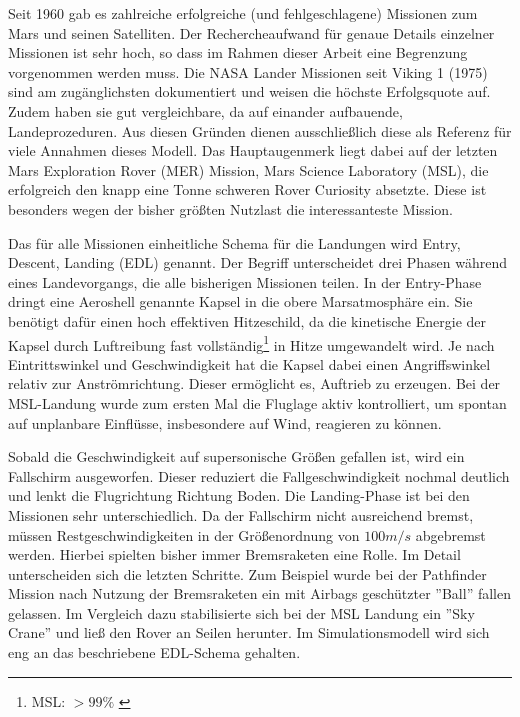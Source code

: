 Seit 1960 gab es zahlreiche erfolgreiche (und fehlgeschlagene) Missionen zum Mars und seinen Satelliten. Der Rechercheaufwand für genaue Details einzelner Missionen ist sehr hoch, so dass im Rahmen dieser Arbeit eine Begrenzung vorgenommen werden muss. Die NASA Lander Missionen seit Viking 1 (1975) sind am zugänglichsten dokumentiert und weisen die höchste Erfolgsquote auf. Zudem haben sie gut vergleichbare, da auf einander aufbauende, Landeprozeduren. Aus diesen Gründen dienen ausschließlich diese als Referenz für viele Annahmen dieses Modell. Das Hauptaugenmerk liegt dabei auf der letzten Mars Exploration Rover (MER) Mission, Mars Science Laboratory (MSL), die erfolgreich den knapp eine Tonne \cite{Way2007} schweren Rover Curiosity absetzte. Diese ist besonders wegen der bisher größten Nutzlast die interessanteste Mission.

Das für alle Missionen einheitliche Schema für die Landungen wird Entry, Descent, Landing (EDL) genannt. Der Begriff unterscheidet drei Phasen während eines Landevorgangs, die alle bisherigen Missionen teilen. In der Entry-Phase dringt eine Aeroshell genannte Kapsel in die obere Marsatmosphäre ein. Sie benötigt dafür einen hoch effektiven Hitzeschild, da die kinetische Energie der Kapsel durch Luftreibung fast vollständig\footnote{MSL: $>99\%$ \cite{Edquist2009}} in Hitze umgewandelt wird. Je nach Eintrittswinkel und Geschwindigkeit hat die Kapsel dabei einen Angriffswinkel relativ zur Anströmrichtung. Dieser ermöglicht es, Auftrieb zu erzeugen. Bei der MSL-Landung wurde zum ersten Mal die Fluglage aktiv kontrolliert, um spontan auf unplanbare Einflüsse, insbesondere auf Wind, reagieren zu können.

Sobald die Geschwindigkeit auf supersonische Größen gefallen ist, wird ein Fallschirm ausgeworfen. Dieser reduziert die Fallgeschwindigkeit nochmal deutlich und lenkt die Flugrichtung Richtung Boden. Die Landing-Phase ist bei den Missionen sehr unterschiedlich. Da der Fallschirm nicht ausreichend bremst, müssen Restgeschwindigkeiten in der Größenordnung von $100m/s$ abgebremst werden. Hierbei spielten bisher immer Bremsraketen eine Rolle. Im Detail unterscheiden sich die letzten Schritte. Zum Beispiel wurde bei der Pathfinder Mission nach Nutzung der Bremsraketen ein mit Airbags geschützter ''Ball'' fallen gelassen. Im Vergleich dazu stabilisierte sich bei der MSL Landung ein ''Sky Crane'' und ließ den Rover an Seilen herunter. Im Simulationsmodell wird sich eng an das beschriebene EDL-Schema gehalten.